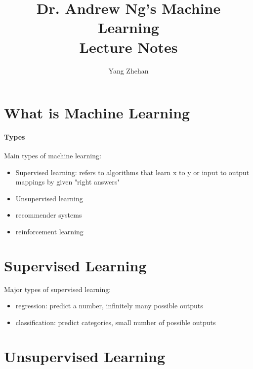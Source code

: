 \documentclass[a4paper,10pt]{article}
\title{Dr. Andrew Ng's Machine Learning\\Lecture Notes}
\author{Yang Zhehan}
\begin{document}
\maketitle
\section{What is Machine Learning}
\paragraph{Types}
Main types of machine learning:
\begin{itemize}
    \item Supervised learning: refers to algorithms that learn x to y or input to output mappings by given "right answers"
    \item Unsupervised learning
    \item recommender systems
    \item reinforcement learning
\end{itemize}
\section{Supervised Learning}

Major types of supervised learning:
\begin{itemize}
    \item regression: predict a number, infinitely many possible outputs
    \item classification: predict categories, small number of possible outputs
\end{itemize}
\section{Unsupervised Learning}
\end{document}
